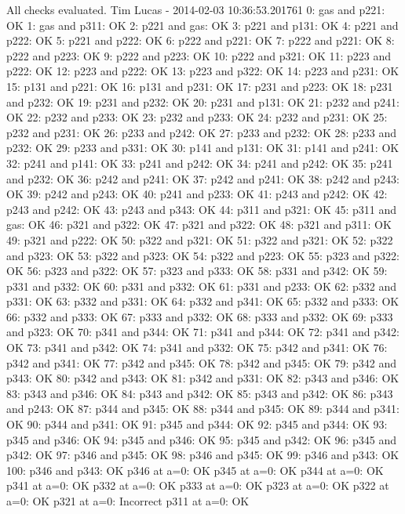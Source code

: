 All checks evaluated.
Tim Lucas - 2014-02-03 10:36:53.201761
0: gas and p221: OK
1: gas and p311: OK
2: p221 and gas: OK
3: p221 and p131: OK
4: p221 and p222: OK
5: p221 and p222: OK
6: p222 and p221: OK
7: p222 and p221: OK
8: p222 and p223: OK
9: p222 and p223: OK
10: p222 and p321: OK
11: p223 and p222: OK
12: p223 and p222: OK
13: p223 and p322: OK
14: p223 and p231: OK
15: p131 and p221: OK
16: p131 and p231: OK
17: p231 and p223: OK
18: p231 and p232: OK
19: p231 and p232: OK
20: p231 and p131: OK
21: p232 and p241: OK
22: p232 and p233: OK
23: p232 and p233: OK
24: p232 and p231: OK
25: p232 and p231: OK
26: p233 and p242: OK
27: p233 and p232: OK
28: p233 and p232: OK
29: p233 and p331: OK
30: p141 and p131: OK
31: p141 and p241: OK
32: p241 and p141: OK
33: p241 and p242: OK
34: p241 and p242: OK
35: p241 and p232: OK
36: p242 and p241: OK
37: p242 and p241: OK
38: p242 and p243: OK
39: p242 and p243: OK
40: p241 and p233: OK
41: p243 and p242: OK
42: p243 and p242: OK
43: p243 and p343: OK
44: p311 and p321: OK
45: p311 and gas: OK
46: p321 and p322: OK
47: p321 and p322: OK
48: p321 and p311: OK
49: p321 and p222: OK
50: p322 and p321: OK
51: p322 and p321: OK
52: p322 and p323: OK
53: p322 and p323: OK
54: p322 and p223: OK
55: p323 and p322: OK
56: p323 and p322: OK
57: p323 and p333: OK
58: p331 and p342: OK
59: p331 and p332: OK
60: p331 and p332: OK
61: p331 and p233: OK
62: p332 and p331: OK
63: p332 and p331: OK
64: p332 and p341: OK
65: p332 and p333: OK
66: p332 and p333: OK
67: p333 and p332: OK
68: p333 and p332: OK
69: p333 and p323: OK
70: p341 and p344: OK
71: p341 and p344: OK
72: p341 and p342: OK
73: p341 and p342: OK
74: p341 and p332: OK
75: p342 and p341: OK
76: p342 and p341: OK
77: p342 and p345: OK
78: p342 and p345: OK
79: p342 and p343: OK
80: p342 and p343: OK
81: p342 and p331: OK
82: p343 and p346: OK
83: p343 and p346: OK
84: p343 and p342: OK
85: p343 and p342: OK
86: p343 and p243: OK
87: p344 and p345: OK
88: p344 and p345: OK
89: p344 and p341: OK
90: p344 and p341: OK
91: p345 and p344: OK
92: p345 and p344: OK
93: p345 and p346: OK
94: p345 and p346: OK
95: p345 and p342: OK
96: p345 and p342: OK
97: p346 and p345: OK
98: p346 and p345: OK
99: p346 and p343: OK
100: p346 and p343: OK
p346 at a=0: OK
p345 at a=0: OK
p344 at a=0: OK
p341 at a=0: OK
p332 at a=0: OK
p333 at a=0: OK
p323 at a=0: OK
p322 at a=0: OK
p321 at a=0: Incorrect
p311 at a=0: OK
